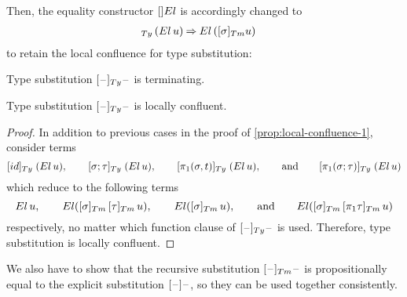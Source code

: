 \documentclass[a4paper,UKenglish,numberwithinsect,cleveref,thm-restate]{lipics-v2021}
\newcommand{\danger}{\marginpar[\hfill\dbend]{\dbend\hfill}}
\begin{document}
Then, the equality constructor $[]\El$ is accordingly changed to 
\begin{align}
  [ \sigma ]_{\Ty}\,(\El\, u) & \reduce \El\,([\sigma]_{\Tm} {u}) \label{eq:def-type-subst-7}
\end{align}
to retain the local confluence for type substitution:
\begin{proposition}[Termination]
  Type substitution $[\blank]_{\Ty}\blank$ is terminating.
  \danger
\end{proposition}
\begin{proposition} \label{prop:local-confluence-2}
  Type substitution $[\blank]_{\Ty}\blank$ is locally confluent.
  \danger
\end{proposition}
\begin{proof}
  In addition to previous cases in the proof of \cref{prop:local-confluence-1}, consider terms 
  \[
    [\idS]_{\Ty}\;(\El\,u), \qquad [\sigma;\tau]_{\Ty}\;(\El\,u), \qquad [\pi_1(\sigma, t)]_{\Ty}\;(\El\,u), \qquad\text{and}\qquad [\pi_1(\sigma; \tau)]_{\Ty}\;(\El\,u)
  \]
  which reduce to the following terms
  \[
    \El\,u, \qquad \El([\sigma]_{\Tm}\,[\tau]_{\Tm}\,u), \qquad \El([\sigma]_{\Tm}\,u), \qquad\text{and}\qquad
    \El([\sigma]_{\Tm}\,[\pi_1\tau]_{\Tm}\,u)
  \]
  respectively, no matter which function clause of $[\blank]_{\Ty}\blank$ is used.
  Therefore, type substitution is locally confluent.
\end{proof}

We also have to show that the recursive substitution $[\blank]_{\Tm}\blank$ is propositionally equal to the explicit substitution $[\mathord{\hspace{1pt}\text{--}\hspace{1pt}}]\mathord{\hspace{1pt}\text{--}\hspace{1pt}}$, so they can be used together consistently.
\end{document}
